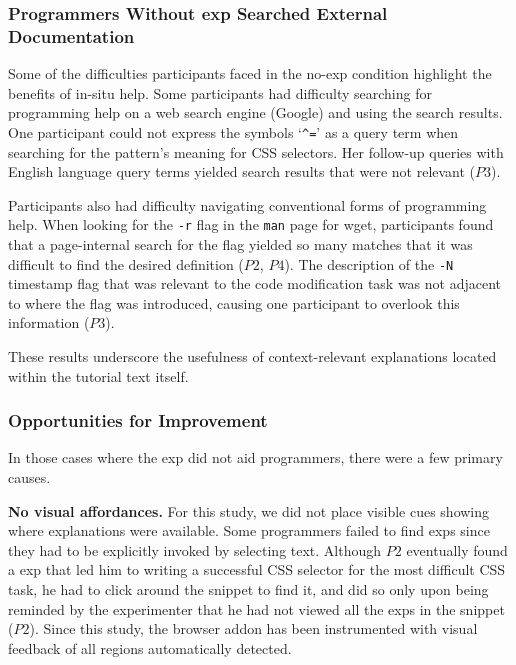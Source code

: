 \subsubsection{Programmers Without \Gls{exp} Searched External Documentation}

Some of the difficulties participants faced in the no-\gls{exp} condition  highlight the benefits of in-situ help.
Some participants had difficulty searching for programming help on a web search engine (Google) and using the search results.
One participant could not express the symbols `\texttt{\^{}=}' as a query term when searching for the pattern's meaning for CSS selectors.
Her follow-up queries with English language query terms  yielded search results that were not relevant ($P3$).

Participants also had difficulty navigating conventional forms of programming help.
When looking for the \texttt{-r} flag in the \texttt{man} page for wget, participants found that a page-internal search for the flag yielded so many matches that it was difficult to find the desired definition ($P2$, $P4$).
The description of the \texttt{-N} timestamp flag that was relevant to the code modification task was not adjacent to where the flag was introduced, causing one participant to overlook this information ($P3$).

These results underscore the usefulness of context-relevant explanations located within the tutorial text itself.

\subsubsection{Opportunities for Improvement}
In those cases where the \gls{exp} did not aid programmers, there were a few primary causes.

{\bf No visual affordances.} For this study, we did not place visible cues showing where explanations were available.
Some programmers failed to find \glspl{exp} since they had to be explicitly invoked by selecting text.
Although $P2$ eventually found a \gls{exp} that led him to writing a successful CSS selector for the most difficult CSS task, he had to click around the snippet to find it, and did so only upon being reminded by the experimenter that he had not viewed all the \glspl{exp} in the snippet ($P2$).
\fi
Since this study, the browser addon has been instrumented with visual feedback of all regions automatically detected.

